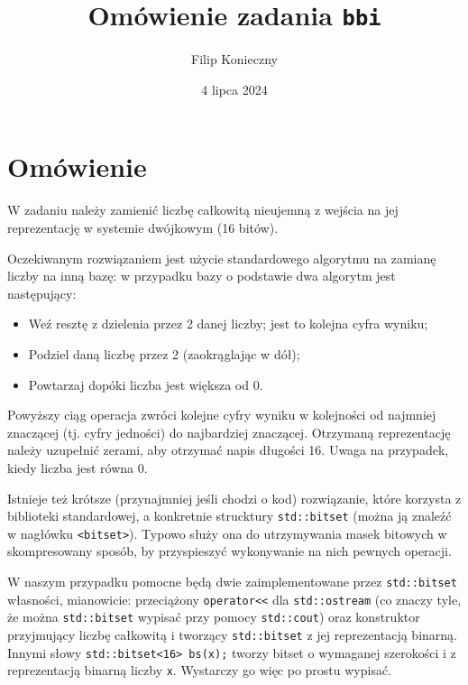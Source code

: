\documentclass[]{article}
\author{Filip Konieczny}
\date{4 lipca 2024}
\title{Omówienie zadania \texttt{bbi}}
\begin{document}
\maketitle
\section{Omówienie}

W zadaniu należy zamienić liczbę całkowitą nieujemną z wejścia na jej reprezentację w systemie dwójkowym (16 bitów).

Oczekiwanym rozwiązaniem jest użycie standardowego algorytmu na zamianę liczby na inną bazę: w przypadku bazy o podstawie dwa algorytm jest następujący:

\begin{itemize}
    \item Weź resztę z dzielenia przez 2 danej liczby; jest to kolejna cyfra wyniku;
    \item Podziel daną liczbę przez 2 (zaokrąglając w dół);
    \item Powtarzaj dopóki liczba jest większa od 0.
\end{itemize}

Powyższy ciąg operacja zwróci kolejne cyfry wyniku w kolejności od najmniej znaczącej (tj. cyfry jedności) do najbardziej znaczącej. Otrzymaną reprezentację należy uzupełnić zerami, aby otrzymać napis długości 16. Uwaga na przypadek, kiedy liczba jest równa 0.

Istnieje też krótsze (przynajmniej jeśli chodzi o kod) rozwiązanie, które korzysta z biblioteki standardowej, a konkretnie strucktury \texttt{std::bitset} (można ją znaleźć w nagłówku \texttt{<bitset>}). Typowo służy ona do utrzymywania masek bitowych w skompresowany sposób, by przyspieszyć wykonywanie na nich pewnych operacji.

W naszym przypadku pomocne będą dwie zaimplementowane przez \texttt{std::bitset} własności, mianowicie: przeciążony \texttt{operator}\texttt{<}\texttt{<} dla \texttt{std::ostream} (co znaczy tyle, że można \texttt{std::bitset} wypisać przy pomocy \texttt{std::cout}) oraz konstruktor przyjmujący liczbę całkowitą i tworzący \texttt{std::bitset} z jej reprezentacją binarną. Innymi słowy \texttt{std::bitset<16> bs(x);} tworzy bitset o wymaganej szerokości i z reprezentacją binarną liczby \texttt{x}. Wystarczy go więc po prostu wypisać.
\end{document}
